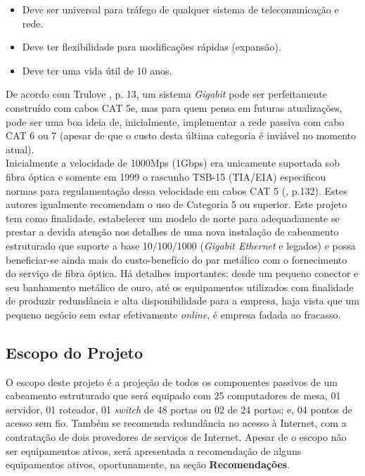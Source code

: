 \documentclass[	DIV=calc,%
							paper=a4,%
							fontsize=12pt,%
							onecolumn]{scrartcl}	 					%
\begin{document}
\begin{itemize}

\item Deve ser universal para tráfego de qualquer sistema de telecomunicação e rede.
\item Deve ter flexibilidade para modificações rápidas (expansão).
\item Deve ter uma vida útil de 10 anos.



\end{itemize}

De acordo com Trulove \cite{trulove2006lan}, p. 13, um sistema \textit{Gigabit} pode ser perfeitamente construído com cabos CAT 5e, mas para quem pensa em futuras atualizações, pode ser uma boa ideia de, inicialmente, implementar a rede passiva com cabo CAT 6 ou 7 (apesar de que o custo desta última categoria é inviável no momento atual).
\\

Inicialmente a velocidade de 1000Mps (1Gbps)  era unicamente suportada sob fibra óptica e somente em 1999 o rascunho TSB-15 (TIA/EIA) especificou normas para regulamentação dessa velocidade em cabos CAT 5 (\cite{barnett2006cabling}, p.132). Estes autores igualmente recomendam o uso de Categoria 5 ou superior. Este projeto tem como finalidade, estabelecer um modelo de norte para adequadamente se prestar a devida atenção nos detalhes de uma nova instalação de cabeamento estruturado que suporte a base 10/100/1000 (\textit{Gigabit Ethernet} e legados) e possa beneficiar-se ainda mais do custo-benefício do par metálico com o fornecimento do serviço de fibra óptica. Há detalhes importantes: desde um pequeno conector e seu banhamento metálico de ouro, até os equipamentos utilizados com finalidade de produzir redundância e alta disponibilidade para a empresa, haja vista que um pequeno negócio sem estar efetivamente \textit{online}, é empresa fadada ao fracasso.
\bigskip

\subsection{Escopo do Projeto}
O escopo deste projeto é a projeção de todos os componentes passivos de um cabeamento estruturado que será equipado com 25 computadores de mesa, 01 servidor, 01 roteador, 01 \textit{switch} de 48 portas ou 02 de 24 portas; e, 04 pontos de acesso sem fio. Também se recomenda redundância no acesso à Internet, com a contratação de dois provedores de serviços de Internet. Apesar de o escopo não ser equipamentos ativos, será apresentada a recomendação de alguns equipamentos ativos, oportunamente, na seção \textbf{Recomendações}.
\end{document}
